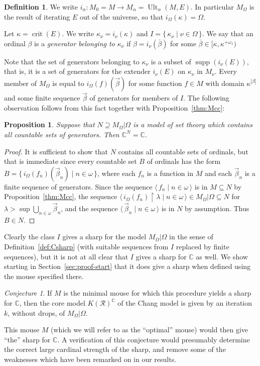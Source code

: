 \documentclass[
twoside,
]{article}
\newtheorem{proposition}[theorem]{Proposition}
\theoremstyle{definition}
\newtheorem{definition}[theorem]{Definition}
\theoremstyle{remark}
\newtheorem{conjecture}[theorem]{Conjecture}
\DeclareMathOperator{\supp}{supp}   %
\newcommand{\ords}{\Omega}
\newcommand\reals{\mathcal{R}}
\newcommand{\cut}{{\vert}}
\newcommand{\set}[1]{\{\,#1\,\}}
\newcommand{\pair}[1]{\langle#1\rangle}
\newcommand{\seq}[1]{\pair{\,#1\,}}
\newcommand{\card}[1]{|#1|}
\DeclareMathOperator{\crit}{crit}
\DeclareMathOperator{\ult}{Ult}
\newcommand{\restrict}{{\upharpoonright}}
\newcommand\chang{\mathbb{C}}
\begin{document}
\begin{definition}\label{def:IFromM}
  We write $i_{\alpha}\colon M_0=M\to M_{\alpha}=\ult_{\alpha}(M,E)$.  
  In particular $M_{\ords}$ is the result of  iterating $E$ out of the
  universe, so that $i_{\ords}(\kappa)=\ords$.

  Let $\kappa=\crit(E)$.  We write
  $\kappa_{\nu}=i_{\nu}(\kappa)$ 
  and $I=\set{\kappa_\nu\mid\nu\in\ords}$.      We say that an
  ordinal $\beta$ is a  \emph{generator
  belonging to $\kappa_{\nu}$} if $\beta=i_{\nu}(\bar\beta)$ for some 
  $\bar{\beta}\in[\kappa,\kappa^{+\omega_1})$
\end{definition}
Note that the set of generators belonging to $\kappa_\nu$ is a subset
of $\supp(i_{\nu}(E))$, that is, it is a set of generators for the
extender $i_{\nu}(E)$ on $\kappa_\nu$ in $M_\nu$.
 Every member of $M_{\ords}$ is equal to 
$i_{\ords}(f)(\vec \beta)$ for some function $f\in M$ with domain
$\kappa^{\card{\beta}}$ and some finite sequence $\vec \beta$  of
generators for members of $I$.
The following observation follows from this fact together with
Proposition~\ref{thm:Mcc}:

\begin{proposition}\label{thm:countable-sets-generators}
  Suppose that $N\supseteq M_{\ords}\cut\ords$ is a model of set
  theory which contains 
  all countable sets of generators.  Then $\chang^{N}=\chang$.
\end{proposition}
\begin{proof}
  It is sufficient to show that $N$ contains all countable sets of
  ordinals, but that is immediate since every countable set  $B$ of
  ordinals has the form
  $B=\set{i_{\ords}(f_{n})(\vec\beta_n)\mid n\in\omega}$, where each
  $f_n$ is a function in $M$ and each $\vec\beta_n$ is a finite
  sequence of generators.  Since the sequence $\seq{f_n\mid n\in\omega}$ is
  in $M\subseteq N$ by Proposition~\ref{thm:Mcc}, the sequence
  $\seq{i_{\ords}(f_n)\restrict\lambda\mid n\in\omega}\in
  M_{\ords}\cut\ords\subseteq N$ for
  $\lambda>\sup\bigcup_{n\in\omega}\vec\beta_n$,  and the sequence
  $\seq{\vec\beta_n\mid n\in\omega}$ is in $N$ by assumption.  Thus $B\in
  N$. 
\end{proof}


Clearly the class $I$ gives a sharp for the model $M_\ords\cut\ords$
in the sense of Definition~\ref{def:Csharp} (with suitable sequences
from $I$
replaced by finite sequences), but it is not at all clear that  $I$ 
gives a sharp for $\chang$ as well.
We show starting in
Section~\ref{sec:proof-start} that it does give a sharp when defined
using the mouse specified there.
\begin{conjecture}\label{thm:optimalmouseconjecture}
  If $M$ is the minimal mouse for which this procedure yields a sharp
  for $\chang$, then the core model $K(\reals)^{\chang}$ of the Chang
  model is given by 
  an iteration $k$, without drops,  of $M_{\ords}\cut\ords$.
\end{conjecture}
This mouse $M$ (which we will refer to as the ``optimal'' mouse) would
then give ``the'' sharp for $\chang$.   A verification of this
conjecture would presumably determine the correct large cardinal strength of the sharp, and
remove some of the weaknesses which have been remarked on in our results.
\end{document}
